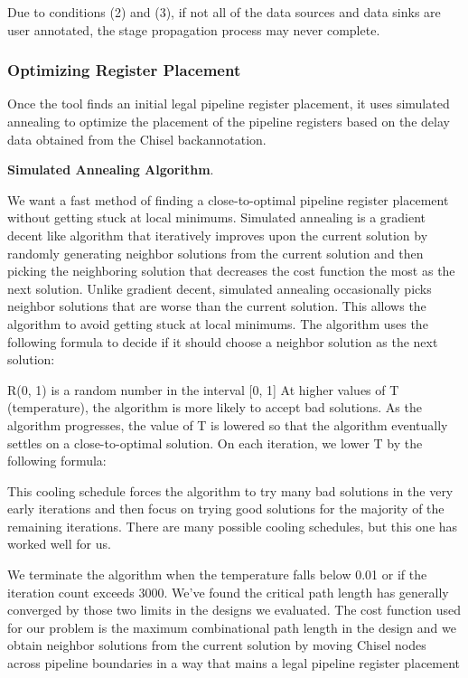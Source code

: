 Due to conditions (2) and (3), if not all of the data sources and data sinks are user annotated, the stage propagation process may never complete.
\subsubsection{Optimizing Register Placement}
Once the tool finds an initial legal pipeline register placement, it uses simulated annealing to optimize the placement of the pipeline registers based on the delay data obtained from the Chisel backannotation.

{\bf Simulated Annealing Algorithm}.

We want a fast method of finding a close-to-optimal pipeline register placement without getting stuck at local minimums. Simulated annealing is a gradient decent like algorithm that iteratively improves upon the current solution by randomly generating neighbor solutions from the current solution and then picking the neighboring solution that decreases the cost function the most as the next solution. Unlike gradient decent, simulated annealing occasionally picks neighbor solutions that are worse than the current solution. This allows the algorithm to avoid getting stuck at local minimums. The algorithm uses the following formula to decide if it should choose a neighbor solution as the next solution:

R(0, 1) is a random number in the interval [0, 1]
At higher values of T (temperature), the algorithm is more likely to accept bad solutions. As the algorithm progresses, the value of T is lowered so that the algorithm eventually settles on a close-to-optimal solution. On each iteration, we lower T by the following formula:

This cooling schedule forces the algorithm to try many bad solutions in the very early iterations and then focus on trying good solutions for the majority of the remaining iterations. There are many possible cooling schedules, but this one has worked well for us.

We terminate the algorithm when the temperature falls below 0.01 or if the iteration count exceeds 3000. We’ve found the critical path length has generally converged by those two limits in the designs we evaluated.
The cost function used for our problem is the maximum combinational path length in the design and we obtain neighbor solutions from the current solution by moving Chisel nodes across pipeline boundaries in a way that mains a legal pipeline register placement

